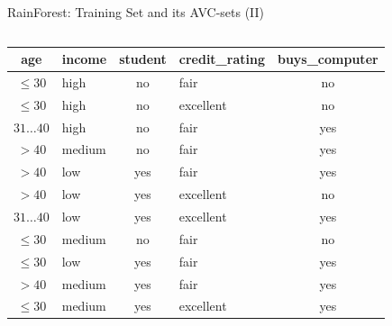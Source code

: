 \begin{frame}{RainForest: Training Set and its AVC-sets (II)}
  \begin{columns}
    \begin{column}{0.6\textwidth}
      \begin{tabular}{|c|l|c|l|c|}
        \hline
        \cellcolor{blue!20}age & \cellcolor{blue!20}income & \cellcolor{blue!20}student & \cellcolor{blue!20}credit\_rating & \cellcolor{brown!20}buys\_computer \\\hline
        \cellcolor{yellow!20}$\leq30$ & \cellcolor{yellow!20}high & \cellcolor{yellow!20}no & \cellcolor{yellow!20}fair & \cellcolor{red!20}no \\\hline
        \cellcolor{yellow!20}$\leq30$ & \cellcolor{yellow!20}high & \cellcolor{yellow!20}no & \cellcolor{yellow!20}excellent & \cellcolor{red!20}no \\\hline
        \cellcolor{yellow!20}$31\ldots40$ & \cellcolor{yellow!20}high & \cellcolor{yellow!20}no & \cellcolor{yellow!20}fair & \cellcolor{green!20}yes \\\hline
        \cellcolor{yellow!20}$>40$ & \cellcolor{yellow!20}medium & \cellcolor{yellow!20}no & \cellcolor{yellow!20}fair & \cellcolor{green!20}yes \\\hline
        \cellcolor{yellow!20}$>40$ & \cellcolor{yellow!20}low & \cellcolor{yellow!20}yes & \cellcolor{yellow!20}fair & \cellcolor{green!20}yes \\\hline
        \cellcolor{yellow!20}$>40$ & \cellcolor{yellow!20}low & \cellcolor{yellow!20}yes & \cellcolor{yellow!20}excellent & \cellcolor{red!20}no \\\hline
        \cellcolor{yellow!20}$31\ldots40$ & \cellcolor{yellow!20}low & \cellcolor{yellow!20}yes & \cellcolor{yellow!20}excellent & \cellcolor{green!20}yes \\\hline
        \cellcolor{yellow!20}$\leq30$ & \cellcolor{yellow!20}medium & \cellcolor{yellow!20}no & \cellcolor{yellow!20}fair & \cellcolor{red!20}no \\\hline
        \cellcolor{yellow!20}$\leq30$ & \cellcolor{yellow!20}low & \cellcolor{yellow!20}yes & \cellcolor{yellow!20}fair & \cellcolor{green!20}yes \\\hline
        \cellcolor{yellow!20}$>40$ & \cellcolor{yellow!20}medium & \cellcolor{yellow!20}yes & \cellcolor{yellow!20}fair & \cellcolor{green!20}yes \\\hline
        \cellcolor{yellow!20}$\leq30$ & \cellcolor{yellow!20}medium & \cellcolor{yellow!20}yes & \cellcolor{yellow!20}excellent & \cellcolor{green!20}yes \\\hline

\end{tabular}
\end{column}
\end{columns}
\end{frame}
